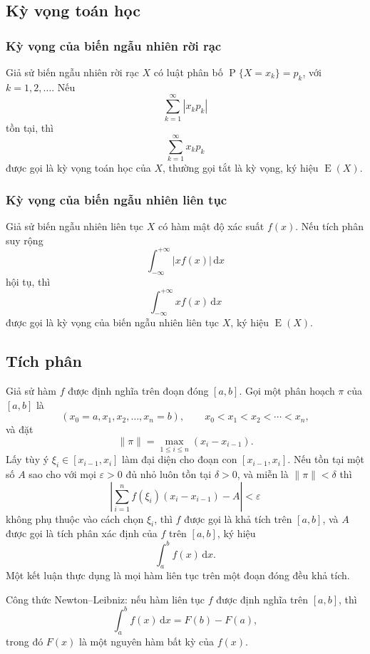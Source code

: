 \documentclass[11pt]{article}
\newcommand{\Prob}{\operatorname{P}}
\newcommand{\E}{\operatorname{E}}
\newcommand{\dd}{\,\mathrm{d}}
\begin{document}
\subsection{Kỳ vọng toán học}

\subsubsection{Kỳ vọng của biến ngẫu nhiên rời rạc}

Giả sử biến ngẫu nhiên rời rạc \(X\) có luật phân bố
\(\Prob\{X=x_k\}=p_k\), với \(k=1,2,\ldots\). Nếu
\[
  \sum_{k=1}^{\infty}|x_kp_k|
\]
tồn tại, thì
\[
  \sum_{k=1}^{\infty}x_kp_k
\]
được gọi là kỳ vọng toán học của \(X\), thường gọi tắt là kỳ vọng, ký hiệu
\(\E(X)\).

\subsubsection{Kỳ vọng của biến ngẫu nhiên liên tục}

Giả sử biến ngẫu nhiên liên tục \(X\) có hàm mật độ xác suất \(f(x)\). Nếu
tích phân suy rộng
\[
  \int_{-\infty}^{+\infty}|xf(x)|\dd x
\]
hội tụ, thì
\[
  \int_{-\infty}^{+\infty}xf(x)\dd x
\]
được gọi là kỳ vọng của biến ngẫu nhiên liên tục \(X\), ký hiệu \(\E(X)\).

\subsection{Tích phân}

Giả sử hàm \(f\) được định nghĩa trên đoạn đóng \([a,b]\). Gọi một phân hoạch
\(\pi\) của \([a,b]\) là
\[
  (x_0=a,x_1,x_2,\ldots,x_n=b),\qquad
  x_0<x_1<x_2<\cdots<x_n,
\]
và đặt
\[
  \|\pi\|=\max_{1\le i\le n}(x_i-x_{i-1}).
\]
Lấy tùy ý \(\xi_i\in[x_{i-1},x_i]\) làm đại diện cho đoạn con
\([x_{i-1},x_i]\). Nếu tồn tại một số \(A\) sao cho với mọi
\(\varepsilon>0\) đủ nhỏ luôn tồn tại \(\delta>0\), và miễn là
\(\|\pi\|<\delta\) thì
\[
  \left|\sum_{i=1}^{n} f(\xi_i)(x_i-x_{i-1})-A\right|<\varepsilon
\]
không phụ thuộc vào cách chọn \(\xi_i\), thì \(f\) được gọi là khả tích trên
\([a,b]\), và \(A\) được gọi là tích phân xác định của \(f\) trên \([a,b]\),
ký hiệu
\[
  \int_a^b f(x)\dd x.
\]
Một kết luận thực dụng là mọi hàm liên tục trên một đoạn đóng đều khả tích.

Công thức Newton--Leibniz: nếu hàm liên tục \(f\) được định nghĩa trên
\([a,b]\), thì
\[
  \int_a^b f(x)\dd x=F(b)-F(a),
\]
trong đó \(F(x)\) là một nguyên hàm bất kỳ của \(f(x)\).
\end{document}
